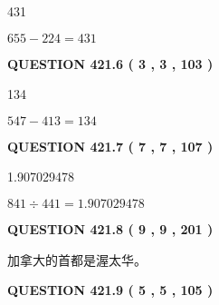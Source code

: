 \documentclass{ctexart}
\begin{document}
431
 
 
 
 
\noindent{}

$ %
655 -  %
224=   %
431$
 
 
  
\vspace{0.2in}
  
{\textbf{\Large{QUESTION
421.6 
 ( 3 , 3 , 103 )
}}}
  
  
 
 
\noindent{}

134
 
 
 
 
\noindent{}

$ %
547 -  %
413=   %
134$
 
 
  
\vspace{0.2in}
  
{\textbf{\Large{QUESTION
421.7 
 ( 7 , 7 , 107 )
}}}
  
  
 
 
\noindent{}

1.907029478
 
 
 
 
\noindent{}

$ %
841 \div  %
441=   %
1.907029478$
 
 
  
\vspace{0.2in}
  
{\textbf{\Large{QUESTION
421.8 
 ( 9 , 9 , 201 )
}}}
  
  
 
 
\noindent{}
 
 
加拿大的首都是渥太华。
 
 
 
 
  
\vspace{0.2in}
  
{\textbf{\Large{QUESTION
421.9 
 ( 5 , 5 , 105 )
}}}
  
  
 
\end{document}
